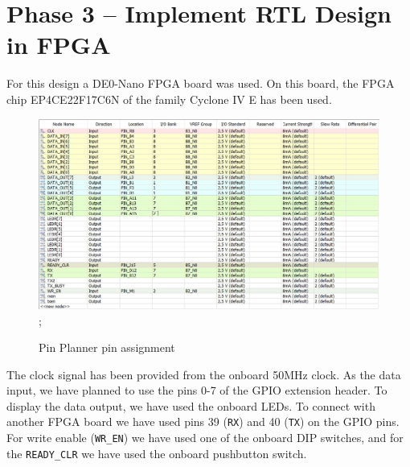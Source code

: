 \documentclass{article}
\begin{document}
                    \section{Phase 3 – Implement RTL Design in FPGA}
                    For this design a DE0-Nano FPGA board was used. On this board, the FPGA chip EP4CE22F17C6N of the family Cyclone IV E has been used. 
                    \begin{figure}[!htb]
                        \centering
                            {\includegraphics[width=15cm]{pins.jpg}};
                            \caption{Pin Planner pin assignment}
                    \end{figure}

                    The clock signal has been provided from the onboard 50MHz clock. As the data input, we have planned to use the pins 0-7 of the GPIO extension header. To display the data output, we have used the onboard LEDs. To connect with another FPGA board we have used pins 39 (\texttt{RX}) and 40 (\texttt{TX}) on the GPIO pins. For write enable (\texttt{WR\_EN}) we have used one of the onboard DIP switches, and for the \texttt{READY\_CLR} we have used the onboard pushbutton switch. 
\end{document}

